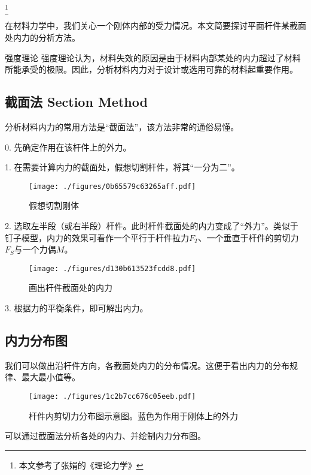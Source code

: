 
\footnote{本文参考了张娟的《理论力学》}

在材料力学中，我们关心一个刚体内部的受力情况。本文简要探讨平面杆件某截面处内力的分析方法。

\begin{example}{强度理论}
强度理论认为，材料失效的原因是由于材料内部某处的内力超过了材料所能承受的极限。因此，分析材料内力对于设计或选用可靠的材料起重要作用。
\end{example}

\subsection{截面法 Section Method}
分析材料内力的常用方法是“截面法”，该方法非常的通俗易懂。

0. 先确定作用在该杆件上的外力。

1. 在需要计算内力的截面处，假想切割杆件，将其“一分为二”。
\begin{figure}[ht]
\centering
\texttt{[image: ./figures/0b65579c63265aff.pdf]}
\caption{假想切割刚体} \label{fig_INTFRC_1}
\end{figure}

2. 选取左半段（或右半段）杆件。此时杆件截面处的内力变成了“外力”。类似于钉子模型，内力的效果可看作一个平行于杆件拉力$F_T$、一个垂直于杆件的剪切力$F_S$与一个力偶$M$。
\begin{figure}[ht]
\centering
\texttt{[image: ./figures/d130b613523fcdd8.pdf]}
\caption{画出杆件截面处的内力} \label{fig_INTFRC_2}
\end{figure}

3. 根据力的平衡条件，即可解出内力。

\subsection{内力分布图}
我们可以做出沿杆件方向，各截面处内力的分布情况。这便于看出内力的分布规律、最大最小值等。
\begin{figure}[ht]
\centering
\texttt{[image: ./figures/1c2b7cc676c05eeb.pdf]}
\caption{杆件内剪切力分布图示意图。蓝色为作用于刚体上的外力} \label{fig_INTFRC_3}
\end{figure}

可以通过截面法分析各处的内力、并绘制内力分布图。

